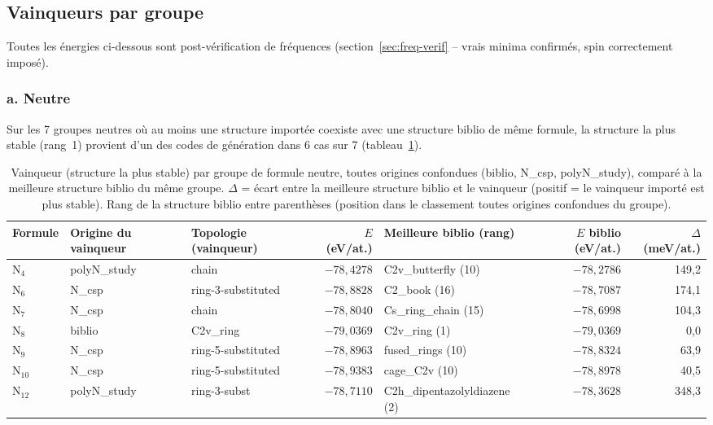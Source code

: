 \documentclass[11pt,a4paper]{article}
\begin{document}
\subsection{Vainqueurs par groupe}
\label{ssec:vainqueurs-par-groupe}

Toutes les \'energies ci-dessous sont post-v\'erification de fr\'equences
(section~\ref{sec:freq-verif} -- vrais minima confirm\'es, spin correctement
impos\'e).

\subsubsection{a. Neutre}

Sur les 7 groupes neutres o\`u au moins une structure import\'ee coexiste
avec une structure biblio de m\^eme formule, la structure la plus stable
(rang~1) provient d'un des codes de g\'en\'eration dans 6 cas sur 7
(tableau~\ref{tab:vainqueurs-neutre}).

\begin{table}[H]
\centering
\small
\begin{tabular}{lllrlrr}
\toprule
Formule & Origine du vainqueur & Topologie (vainqueur) & $E$ (eV/at.) & Meilleure biblio (rang) & $E$ biblio (eV/at.) & $\Delta$ (meV/at.) \\
\midrule
N$_4$  & polyN\_study & chain              & $-78{,}4278$ & C2v\_butterfly (10) & $-78{,}2786$ & 149{,}2 \\
N$_6$  & N\_csp       & ring-3-substituted & $-78{,}8828$ & C2\_book (16)       & $-78{,}7087$ & 174{,}1 \\
N$_7$  & N\_csp       & chain              & $-78{,}8040$ & Cs\_ring\_chain (15)& $-78{,}6998$ & 104{,}3 \\
N$_8$  & biblio       & C2v\_ring          & $-79{,}0369$ & C2v\_ring (1)       & $-79{,}0369$ & 0{,}0 \\
N$_9$  & N\_csp       & ring-5-substituted & $-78{,}8963$ & fused\_rings (10)   & $-78{,}8324$ & 63{,}9 \\
N$_{10}$ & N\_csp     & ring-5-substituted & $-78{,}9383$ & cage\_C2v (10)      & $-78{,}8978$ & 40{,}5 \\
N$_{12}$ & polyN\_study & ring-3-subst     & $-78{,}7110$ & C2h\_dipentazolyldiazene (2) & $-78{,}3628$ & 348{,}3 \\
\bottomrule
\end{tabular}
\caption{Vainqueur (structure la plus stable) par groupe de formule
neutre, toutes origines confondues (biblio, N\_csp, polyN\_study),
compar\'e \`a la meilleure structure biblio du m\^eme groupe. $\Delta$ =
\'ecart entre la meilleure structure biblio et le vainqueur (positif = le
vainqueur import\'e est plus stable). Rang de la structure biblio entre
parenth\`eses (position dans le classement toutes origines confondues du
groupe).}
\label{tab:vainqueurs-neutre}
\end{table}
\end{document}
